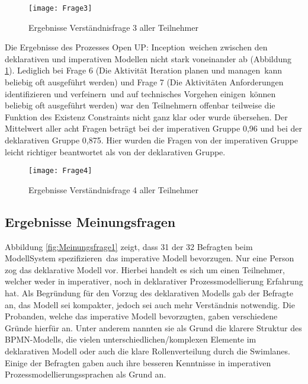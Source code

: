 \begin{figure}[htp]
\begin{center}
  \texttt{[image: Frage3]} %
  \caption{Ergebnisse Verständnisfrage 3 aller Teilnehmer}
  \label{fig:Frage3}
\end{center}
\end{figure}

Die Ergebnisse des Prozesses \grqq Open UP: Inception\grqq \ weichen zwischen den deklarativen und imperativen Modellen nicht stark voneinander ab (Abbildung \ref{fig:Frage3}). \newline
Lediglich bei Frage 6 (\grqq Die Aktivität \grqq Iteration planen und managen\grqq \ kann beliebig oft ausgeführt werden\grqq) und Frage 7 (\grqq Die Aktivitäten \grqq Anforderungen identifizieren und verfeinern\grqq \ und \grqq auf technisches Vorgehen einigen\grqq \ können beliebig oft ausgeführt werden) war den Teilnehmern offenbar teilweise die Funktion des Existenz Constraints nicht ganz klar oder wurde übersehen.\newline
Der Mittelwert aller acht Fragen beträgt bei der imperativen Gruppe 0,96 und bei der deklarativen Gruppe 0,875. Hier wurden die Fragen von der imperativen Gruppe leicht richtiger beantwortet als von der deklarativen Gruppe. \newline


\begin{figure}[htp]
\begin{center}
  \texttt{[image: Frage4]} %
  \caption{Ergebnisse Verständnisfrage 4 aller Teilnehmer}
  \label{fig:Frage4}
\end{center}
\end{figure}

\clearpage


\subsection{Ergebnisse Meinungsfragen}

Abbildung \ref{fig:Meinungsfrage1} zeigt, dass 31 der 32 Befragten beim Modell\grqq System spezifizieren\grqq \ das imperative Modell bevorzugen. Nur eine Person zog das deklarative Modell vor. Hierbei handelt es sich um einen Teilnehmer, welcher weder in imperativer, noch in deklarativer Prozessmodellierung Erfahrung hat. Als Begründung für den Vorzug des deklarativen Modells gab der Befragte an, das Modell sei kompakter, jedoch sei auch mehr Verständnis notwendig.\newline
Die Probanden, welche das imperative Modell bevorzugten, gaben verschiedene Gründe hierfür an. Unter anderem nannten sie als Grund die klarere Struktur des BPMN-Modells, die vielen unterschiedlichen/komplexen Elemente im deklarativen Modell oder auch die klare Rollenverteilung durch die Swimlanes. Einige der Befragten gaben auch ihre besseren Kenntnisse in imperativen Prozessmodellierungssprachen als Grund an.\newline

